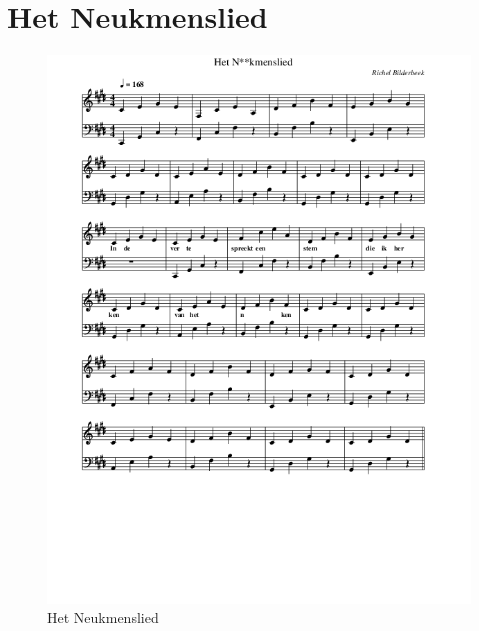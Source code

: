 \section{Het Neukmenslied}



\begin{figure}[!htbp]
  \includegraphics[width=\textwidth,height=\textheight,keepaspectratio]{../songs/15_het_neukmenslied.png}
  \caption{Het Neukmenslied}
  \label{fig:15_het_neukmenslied}
\end{figure}
